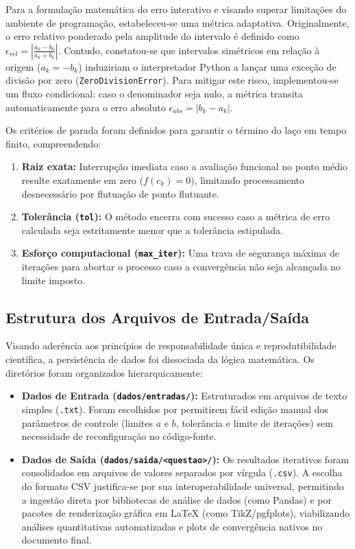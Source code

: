 Para a formulação matemática do erro interativo e visando superar limitações do ambiente de programação, estabeleceu-se uma métrica adaptativa. Originalmente, o erro relativo ponderado pela amplitude do intervalo é definido como $\epsilon_{rel} = \left| \frac{a_k - b_k}{a_k + b_k} \right|$. Contudo, constatou-se que intervalos simétricos em relação à origem ($a_k = -b_k$) induziriam o interpretador Python a lançar uma exceção de divisão por zero (\texttt{ZeroDivisionError}). Para mitigar este risco, implementou-se um fluxo condicional: caso o denominador seja nulo, a métrica transita automaticamente para o erro absoluto $\epsilon_{abs} = |b_k - a_k|$. 

Os critérios de parada foram definidos para garantir o término do laço em tempo finito, compreendendo:
\begin{enumerate}
    \item \textbf{Raiz exata:} Interrupção imediata caso a avaliação funcional no ponto médio resulte exatamente em zero ($f(c_k) = 0$), limitando processamento desnecessário por flutuação de ponto flutuante.
    \item \textbf{Tolerância (\texttt{tol}):} O método encerra com sucesso caso a métrica de erro calculada seja estritamente menor que a tolerância estipulada.
    \item \textbf{Esforço computacional (\texttt{max\_iter}):} Uma trava de segurança máxima de iterações para abortar o processo caso a convergência não seja alcançada no limite imposto.
\end{enumerate}

\subsection{Estrutura dos Arquivos de Entrada/Saída}
\label{subsec:estrutura_arquivos_bisseccao}

Visando aderência aos princípios de responsabilidade única e reprodutibilidade científica, a persistência de dados foi dissociada da lógica matemática. Os diretórios foram organizados hierarquicamente:

\begin{itemize}
    \item \textbf{Dados de Entrada (\texttt{dados/entradas/}):} Estruturados em arquivos de texto simples (\texttt{.txt}). Foram escolhidos por permitirem fácil edição manual dos parâmetros de controle (limites $a$ e $b$, tolerância e limite de iterações) sem necessidade de reconfiguração no código-fonte.
    \item \textbf{Dados de Saída (\texttt{dados/saida/<questao>/}):} Os resultados iterativos foram consolidados em arquivos de valores separados por vírgula (\texttt{.csv}). A escolha do formato CSV justifica-se por sua interoperabilidade universal, permitindo a ingestão direta por bibliotecas de análise de dados (como Pandas) e por pacotes de renderização gráfica em LaTeX (como TikZ/pgfplots), viabilizando análises quantitativas automatizadas e plots de convergência nativos no documento final.
\end{itemize}

